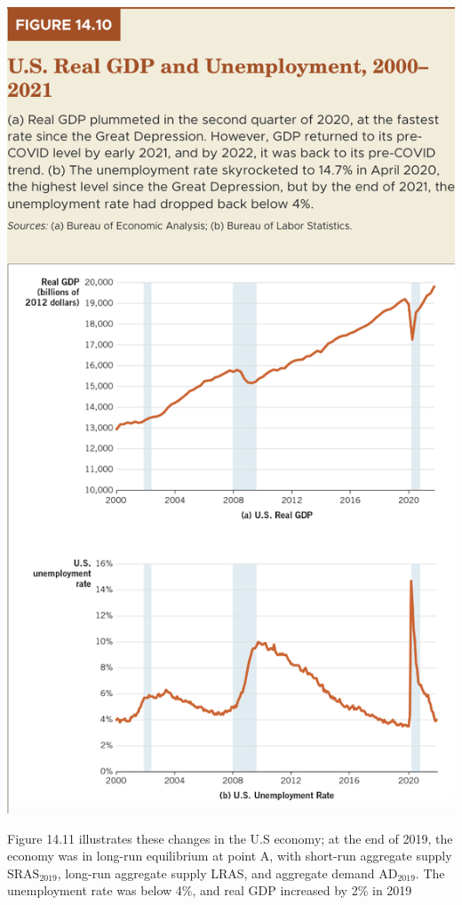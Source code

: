 \documentclass[11pt]{article} %
\begin{document}
\begin{center}
\includegraphics[scale=0.5]{images/Figure 14.10.png}
\end{center}
Figure 14.11 illustrates these changes in the U.S economy; at the end of 2019, the economy was in long-run equilibrium at point A, with short-run aggregate supply \(\text{SRAS}_{2019}\), long-run aggregate supply LRAS, and aggregate demand \(\text{AD}_{2019}\). The unemployment rate was below 4\%, and real GDP increased by 2\% in 2019
\end{document}
